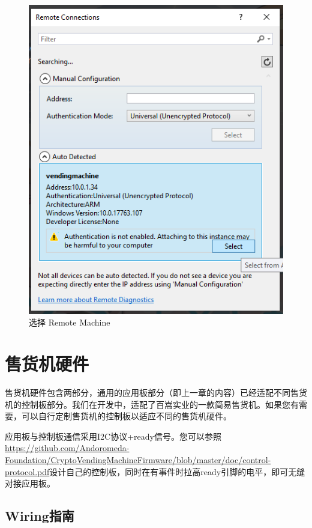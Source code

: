 \documentclass[a4paper,11pt]{article}
\theoremstyle{definition}
\begin{document}
    \begin{figure}[htbp]
    \minipage[b][][b]{\textwidth}
        \includegraphics{remoteselection.png}
        \caption{选择 Remote Machine}
        \label{fig:remotemachineselection}
    \endminipage\hfill
    \end{figure}
    
\section{售货机硬件}

售货机硬件包含两部分，通用的应用板部分（即上一章的内容）已经适配不同售货机的控制板部分。我们在开发中，适配了百嵩实业的一款简易售货机。如果您有需要，可以自行定制售货机的控制板以适应不同的售货机硬件。

应用板与控制板通信采用I2C协议+ready信号。您可以参照 \\ \url{https://github.com/Andoromeda-Foundation/CryptoVendingMachineFirmware/blob/master/doc/control-protocol.pdf}设计自己的控制板，同时在有事件时拉高ready引脚的电平，即可无缝对接应用板。

\subsection{Wiring指南}
\end{document}
